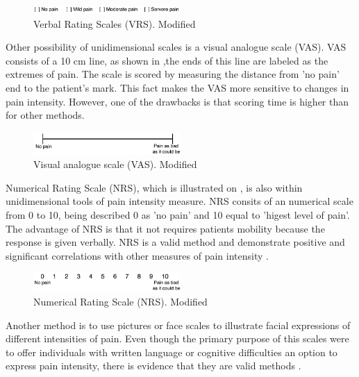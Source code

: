 \begin{figure}[H]
	\includegraphics[width=0.5\textwidth]{figures/VRS.png} 
	\caption{Verbal Rating Scales (VRS). Modified~\cite{Jensen2001}}
	\label{fig:VRS}  
\end{figure}   

Other possibility of unidimensional scales is a visual analogue scale (VAS). VAS consists of a 10 cm line, as shown in ,the ends of this line are labeled as the extremes of pain. The scale is scored by measuring the distance from 'no pain' end to the patient's mark. This fact makes the VAS more sensitive to changes in pain intensity. However, one of the drawbacks is that scoring time is higher than for other methods.~\cite{Jensen2001} 

\begin{figure}[H]
	\includegraphics[width=0.5\textwidth]{figures/VAS.png} 
	\caption{Visual analogue scale (VAS). Modified~\cite{Jensen2001}}
	\label{fig:VAS}  
\end{figure}   

Numerical Rating Scale (NRS), which is illustrated on , is also within unidimensional tools of pain intensity measure. NRS consits of an numerical scale from 0 to 10, being described 0 as 'no pain' and  10 equal to 'higest level of pain'. The advantage of NRS is that it not requires patients mobility because the response is given verbally. NRS is a valid method and demonstrate positive and significant correlations with other measures of pain intensity \cite{Jensen2001}. 

\begin{figure}[H]
	\includegraphics[width=0.5\textwidth]{figures/NRS.png} 
	\caption{Numerical Rating Scale (NRS). Modified~\cite{Jensen2001}}
	\label{fig:NRS}  
\end{figure}   

Another method is to use pictures or face scales to illustrate facial expressions of different intensities of pain. Even though the primary purpose of this scales were to offer individuals with written language or cognitive difficulties an option to express pain intensity, there is evidence that they are valid methods \cite{Jensen2001}. 

